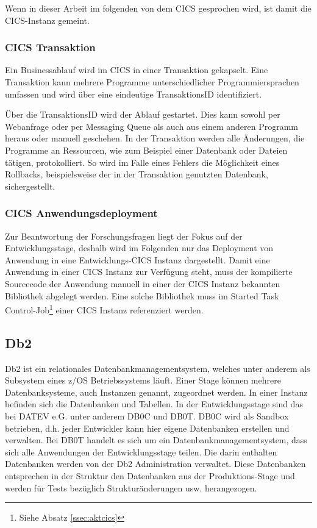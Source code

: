 Wenn in dieser Arbeit im folgenden von dem CICS gesprochen wird, ist damit die CICS-Instanz  gemeint.

\subsubsection{CICS Transaktion}\label{subsec:trans}
Ein Businessablauf wird im CICS in einer Transaktion gekapselt.
Eine Transaktion kann mehrere Programme unterschiedlicher Programmiersprachen umfassen und wird über eine eindeutige \glqq TransaktionsID\grqq{} identifiziert.

Über die TransaktionsID wird der Ablauf gestartet.
Dies kann sowohl per Webanfrage oder per Messaging Queue als auch aus einem anderen Programm heraus oder manuell geschehen.
In der Transaktion werden alle Änderungen, die Programme an Ressourcen, wie zum Beispiel einer Datenbank oder Dateien tätigen, protokolliert.
So wird im Falle eines Fehlers die Möglichkeit eines Rollbacks, beispielsweise der in der Transaktion genutzten Datenbank, sichergestellt.
 \cite[5-8]{Rayns.2011}

\subsubsection{CICS Anwendungsdeployment}\label{sssec:cicsanwd}
Zur Beantwortung der Forschungsfragen liegt der Fokus auf der Entwicklungsstage, deshalb wird im Folgenden nur das Deployment von Anwendung in eine Entwicklungs-CICS Instanz dargestellt.
Damit eine Anwendung in einer CICS Instanz zur Verfügung steht, muss der kompilierte Sourcecode der Anwendung manuell in einer der CICS Instanz bekannten Bibliothek abgelegt werden.
Eine solche Bibliothek muss im \glqq Started Task Control-Job\grqq{}\footnote{Siehe Absatz \ref{ssec:aktcics}} einer CICS Instanz referenziert werden.

\subsection{Db2}\label{sssec:db2}
Db2 ist ein relationales Datenbankmanagementsystem, welches unter anderem als Subsystem eines z/OS Betriebssystems läuft.
Einer Stage können mehrere Datenbanksysteme, auch Instanzen genannt, zugeordnet werden.
In einer Instanz befinden sich die Datenbanken und Tabellen. 
In der Entwicklungsstage sind das bei DATEV e.G. unter anderem \glqq DB0C\grqq{} und \glqq DB0T\grqq.
DB0C wird als Sandbox betrieben, d.h. jeder Entwickler kann hier eigene Datenbanken erstellen und verwalten.
Bei DB0T handelt es sich um ein Datenbankmanagementsystem, dass sich alle Anwendungen der Entwicklungsstage teilen.
Die darin enthalten Datenbanken werden von der Db2 Administration verwaltet.
Diese Datenbanken entsprechen in der Struktur den Datenbanken aus der Produktions-Stage und werden für Tests bezüglich Strukturänderungen usw. herangezogen.


